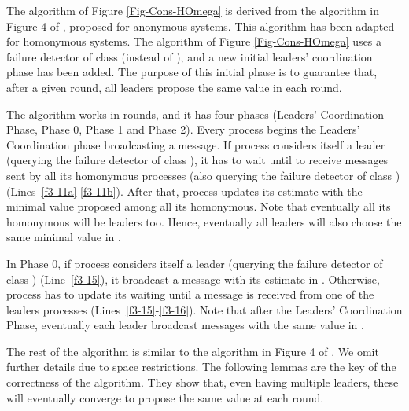\documentclass[10pt, conference, compsocconf]{IEEEtran}
\begin{document}
The algorithm of Figure \ref{Fig-Cons-HOmega} is derived from the algorithm
in  Figure  4 of  \cite{DBLP:conf/aina/BonnetR10},  proposed for  anonymous
systems. This algorithm has been adapted for homonymous  
systems.  The  algorithm of  Figure  \ref{Fig-Cons-HOmega}  uses a  failure
detector  of class   (instead of  ), and  a new  initial leaders'
coordination phase has been added. The  purpose of this initial phase is to
guarantee that, after a given round,  all leaders propose the same value in
each round. 

The  algorithm  works   in  rounds,  and  it  has   four  phases  (Leaders'
Coordination Phase, Phase 0, Phase 1 and Phase 2).  
Every  process  begins  the Leaders'  Coordination phase  broadcasting a
 message. 
If process  considers itself a leader (querying the failure detector 
of class ), it has to wait 
 until  to   receive    messages  sent   by  all  its
homonymous  processes (also  querying  the failure  detector   of  class
) (Lines~\ref{f3-11a}-\ref{f3-11b}).  After that, process   updates
its estimate  with the minimal value  
proposed among all its homonymous.  Note that eventually all its homonymous
will be leaders too. Hence, eventually  
all leaders will also choose the same minimal value in . 

In Phase 0, if process   considers itself a leader (querying the failure
detector  of class ) (Line~\ref{f3-15}), 
it   broadcast   a      message  with   its   estimate   in
. Otherwise, process  has to update its  waiting until a
 message is received from  one of the leaders processes 
(Lines~\ref{f3-15}-\ref{f3-16}).  
Note that after the Leaders' Coordination Phase, eventually each leader 
broadcast  messages with the same value in . 





The  rest of  the algorithm  is similar  to the  algorithm in  Figure  4 of
\cite{DBLP:conf/aina/BonnetR10}.  We  omit  further  details due  to  space
restrictions. 
The following lemmas are the key  of the correctness of the algorithm. They
show that, even having multiple  leaders, these will eventually converge to
propose the same value at each round. 
 
\end{document}
